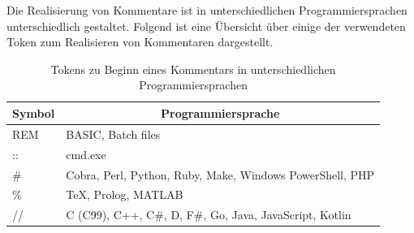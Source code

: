 Die Realisierung von Kommentare ist in unterschiedlichen Programmiersprachen unterschiedlich gestaltet. Folgend ist eine Übersicht über einige der verwendeten Token zum Realisieren von Kommentaren dargestellt. 
\begin{table}[]
	\centering
	\begin{tabular}{|l|l|}
		\hline
		\multicolumn{1}{|c|}{Symbol} & \multicolumn{1}{|c|}{Programmiersprache} \\ \hline
		REM    & BASIC, Batch files                                         	\\ \hline
		::     & cmd.exe                                                    	\\ \hline
		\#     & Cobra, Perl, Python, Ruby, Make, Windows PowerShell, PHP   	\\ \hline
		\%     & TeX, Prolog, MATLAB                                        	\\ \hline
		//     & C (C99), C++, C\#, D, F\#, Go, Java, JavaScript, Kotlin			\\ \hline
	\end{tabular}
	\caption{Tokens zu Beginn eines Kommentars in unterschiedlichen Programmiersprachen}
\end{table}
\FloatBarrier

